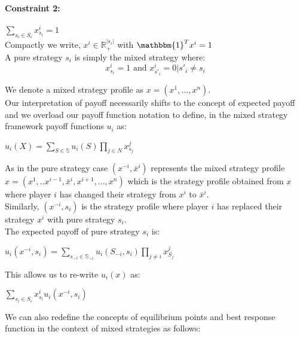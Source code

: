 \documentclass[12pt]{article}
\begin{document}
\paragraph{Constraint 2:} $\sum\limits_{s_i \in S_i} x^i_{s_i} = 1$\\
Compactly we write, $x^i \in \mathbb{R}^{|s_i|}_+$ with $\mathbbm{1}^T x^i = 1$\\

A pure strategy $s_i$ is simply the mixed strategy where:
\begin{equation*}
	x^i_{s_i} = 1 \text{ and }  x^i_{s'_i} = 0 | s'_i \neq s_i
\end{equation*}

We denote a mixed strategy profile as $x = (x^1, ... , x^n)$.\\ 

Our interpretation of payoff necessarily shifts to the concept of expected payoff and we overload our payoff function notation to define, in the mixed strategy framework payoff functions $u_i$ as:
\begin{center}
$u_i(X) = \sum\limits_{S \in \mathbb{S}} u_i(S)\prod\limits_{j \in N} x^j_{s_j}$\\
\end{center}
As in the pure strategy case $(x^{-i}, \bar{x}^i)$ represents the mixed strategy profile $x = (x^1, .. x^{i-1}, \bar{x}^i, x^{i+1}, ... ,x^n)$ which is the strategy profile obtained from $x$ where player $i$ has changed their strategy from $x^i$ to $\bar{x}^i$.\\

Similarly, $(x^{-i}, s_i)$ is the strategy profile where player $i$ has replaced their strategy $x^i$ with pure strategy $s_i$.\\

The expected payoff of pure strategy $s_i$ is:
\begin{center} $u_i(x^{-i},s_i) = \sum\limits_{s_{-i} \in \mathbb{S}_{-i}} u_i(S_{-i}, s_i) \prod\limits_{j \neq i} x^j_{S_j}$\\
\end{center}

This allows us to re-write $u_i(x)$ as:

\begin{center}
$\sum\limits_{s_i \in S_i} x^i_{s_i} u_i(x^{-i},s_i)$
\end{center}
We can also redefine the concepts of equilibrium points and best response function in the context of mixed strategies as follows:
\end{document}
